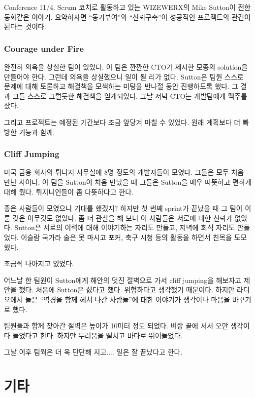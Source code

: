 \documentclass[11pt]{article}
\begin{document}
Conference 11/4. Scrum 코치로 활동하고 있는 WIZEWERX의 Mike Sutton이 전한 
동화같은 이야기. 요약하자면 ``동기부여''와 ``신뢰구축''이 성공적인 프로젝트의 
관건이 된다는 것이다.
 
\subsubsection{Courage under Fire}
 
완전히 의욕을 상실한 팀이 있었다. 이 팀은 깐깐한 CTO가 제시한 모종의 solution을
만들어야 한다. 그런데 의욕을 상실했으니 일이 될 리가 없다. Sutton은
팀원 스스로 문제에 대해 토론하고 해결책을 모색하는 미팅을 반나절 동안
진행하도록 했다. 그 결과 그들 스스로 그럴듯한 해결책을 얻게되었다. 그날
저녁 CTO는 개발팀에게 맥주를 샀다.
 
그리고 프로젝트는 예정된 기간보다 조금 앞당겨 마칠 수 
있었다. 원래 계획보다 더 빠방한 기능과 함께.

\subsubsection{Cliff Jumping}
 
미국 금융 회사의 튀니지 사무실에 8명 정도의 개발자들이 모였다. 그들은
모두 처음 만난 사이다.  이 팀을 Sutton이 처음 만났을 때 그들은 Sutton을
매우 따뜻하고 편하게 대해 줬다. 튀지니인들이 좀 다뜻하다고 한다.
 
좋은 사람들이 모였으니 기대를 했겠지? 하지만 첫 번째 sprint가 끝났을 때
그 팀이 이룬 것은 아무것도 없었다. 좀 더 관찰을 해 보니 이 사람들은
서로에 대한 신뢰가 없었다. Sutton은 서로의 이력에 대해 이야기하는
자리도 만들고, 저녁에 회식 자리도 만들었다. 이슬람 국가라 술은 못
마시고 포커, 축구 시청 등의 활동을 하면서 친목을 도모했다.
 
조금씩 나아지고 있었다.
 
어느날 한 팀원이 Sutton에게 해안의 멋진 절벽으로 가서 cliff jumping을
해보자고 제안을 했다. 처음에 Sutton은 싫다고 했다. 위험하다고 생각했기
때문이다.  하지만 라디오에서 들은 ``역경을 함께 헤쳐 나간 사람들''에 대한
이야기가 생각이나 마음을 바꾸기로 했다.
 
팀원들과 함께 찾아간 절벽은 높이가 10미터 정도 되었다. 벼랑 끝에 서서
오만 생각이 다 들었다고 한다. 하지만 두려움을 떨치고 바다로
뛰어들었다.
 
그날 이후 팀웍은 더 욱 단단해 지고.... 일은 잘 끝났다고 한다.
 
\section{기타}
\end{document}
